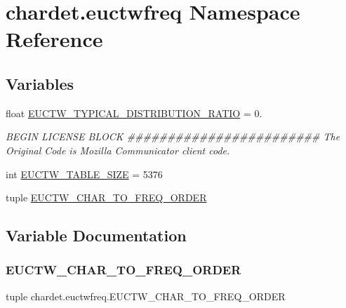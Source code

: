 \hypertarget{namespacechardet_1_1euctwfreq}{}\section{chardet.\+euctwfreq Namespace Reference}
\label{namespacechardet_1_1euctwfreq}
\subsection*{Variables}
\begin{DoxyCompactItemize}
\item 
float \hyperlink{namespacechardet_1_1euctwfreq_a764b084d89cbe2a231a6cdcfe7d640a5}{E\+U\+C\+T\+W\+\_\+\+T\+Y\+P\+I\+C\+A\+L\+\_\+\+D\+I\+S\+T\+R\+I\+B\+U\+T\+I\+O\+N\+\_\+\+R\+A\+T\+IO} = 0.
\begin{DoxyCompactList}\small\item\em B\+E\+G\+IN L\+I\+C\+E\+N\+SE B\+L\+O\+CK \#\#\#\#\#\#\#\#\#\#\#\#\#\#\#\#\#\#\#\#\#\#\#\# The Original Code is Mozilla Communicator client code. \end{DoxyCompactList}\item 
int \hyperlink{namespacechardet_1_1euctwfreq_a0b1d23136aa4c006c236b208f05a5d7a}{E\+U\+C\+T\+W\+\_\+\+T\+A\+B\+L\+E\+\_\+\+S\+I\+ZE} = 5376
\item 
tuple \hyperlink{namespacechardet_1_1euctwfreq_a672d5da530241570689db8a800886686}{E\+U\+C\+T\+W\+\_\+\+C\+H\+A\+R\+\_\+\+T\+O\+\_\+\+F\+R\+E\+Q\+\_\+\+O\+R\+D\+ER}
\end{DoxyCompactItemize}


\subsection{Variable Documentation}
\mbox{\label{namespacechardet_1_1euctwfreq_a672d5da530241570689db8a800886686}} 
\subsubsection{\texorpdfstring{E\+U\+C\+T\+W\+\_\+\+C\+H\+A\+R\+\_\+\+T\+O\+\_\+\+F\+R\+E\+Q\+\_\+\+O\+R\+D\+ER}{EUCTW\_CHAR\_TO\_FREQ\_ORDER}}
{\footnotesize\ttfamily tuple chardet.\+euctwfreq.\+E\+U\+C\+T\+W\+\_\+\+C\+H\+A\+R\+\_\+\+T\+O\+\_\+\+F\+R\+E\+Q\+\_\+\+O\+R\+D\+ER}


